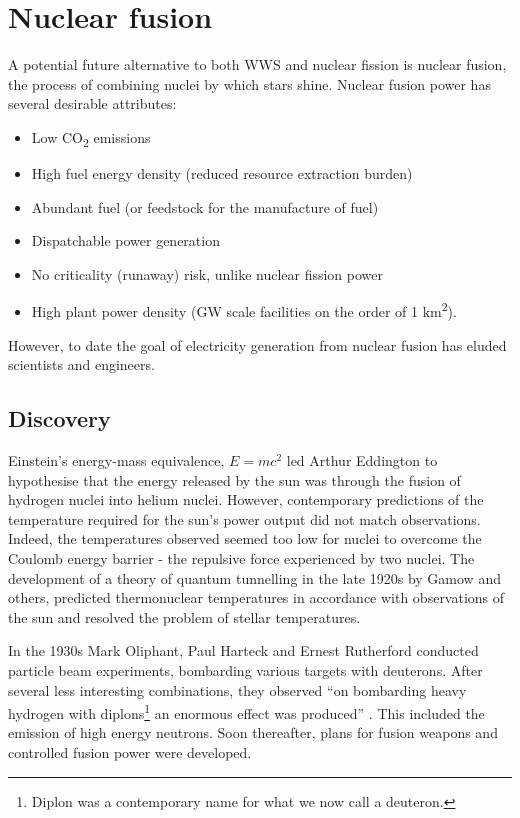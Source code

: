 \section{Nuclear fusion}
A potential future alternative to both WWS and nuclear fission is nuclear fusion, the process of combining nuclei by which stars shine. Nuclear fusion power has several desirable attributes:

\begin{itemize}
  \item Low CO\textsubscript{2} emissions
  \item High fuel energy density (reduced resource extraction burden)
  \item Abundant fuel (or feedstock for the manufacture of fuel)
  \item Dispatchable power generation
  \item No criticality (runaway) risk, unlike nuclear fission power
  \item High plant power density (GW scale facilities on the order of 1 km\textsuperscript{2}). 
\end{itemize}

However, to date the goal of electricity generation from nuclear fusion has eluded scientists and engineers.  

\subsection{Discovery}
Einstein's energy-mass equivalence, $E=mc^{2}$ led Arthur Eddington to hypothesise that the energy released by the sun was through the fusion of hydrogen nuclei into helium nuclei. However, contemporary predictions of the temperature required for the sun's power output did not match observations. Indeed, the temperatures observed seemed too low for nuclei to overcome the Coulomb energy barrier - the repulsive force experienced by two nuclei. The development of a theory of quantum tunnelling in the late 1920s by Gamow and others, predicted thermonuclear temperatures in accordance with observations of the sun and resolved the problem of stellar temperatures.

In the 1930s Mark Oliphant, Paul Harteck and Ernest Rutherford conducted particle beam experiments, bombarding various targets with deuterons. After several less interesting combinations, they observed ``on bombarding heavy hydrogen with diplons\footnote{Diplon was a contemporary name for what we now call a deuteron.} an enormous effect was produced'' \cite{oliphant1934}. This included the emission of high energy neutrons. Soon thereafter, plans for fusion weapons and controlled fusion power were developed.

